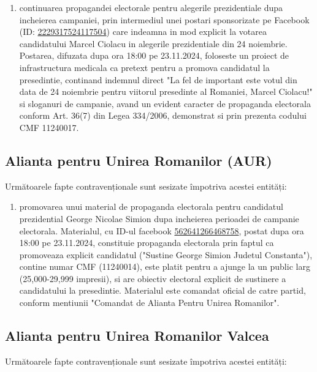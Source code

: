 \documentclass[a4paper,12pt]{article}
\begin{document}
\begin{enumerate}[leftmargin=*, label=\arabic*.)]
    \item continuarea propagandei electorale pentru alegerile prezidentiale dupa incheierea campaniei, prin intermediul unei postari sponsorizate pe Facebook (ID: \href{https://www.facebook.com/ads/library/?id=2229317524117504}{2229317524117504}) care indeamna in mod explicit la votarea candidatului Marcel Ciolacu in alegerile prezidentiale din 24 noiembrie. Postarea, difuzata dupa ora 18:00 pe 23.11.2024, foloseste un proiect de infrastructura medicala ca pretext pentru a promova candidatul la presedintie, continand indemnul direct "La fel de important este votul din data de 24 noiembrie pentru viitorul presedinte al Romaniei, Marcel Ciolacu!" si sloganuri de campanie, avand un evident caracter de propaganda electorala conform Art. 36(7) din Legea 334/2006, demonstrat si prin prezenta codului CMF 11240017.
\end{enumerate}

\vspace{0.5cm}

\subsection{Alianta pentru Unirea Romanilor (AUR)}
Următoarele fapte contravenționale sunt sesizate împotriva acestei entități:

\begin{enumerate}[leftmargin=*, label=\arabic*.)]
    \item promovarea unui material de propaganda electorala pentru candidatul prezidential George Nicolae Simion dupa incheierea perioadei de campanie electorala. Materialul, cu ID-ul facebook \href{https://www.facebook.com/ads/library/?id=562641266468758}{562641266468758}, postat dupa ora 18:00 pe 23.11.2024, constituie propaganda electorala prin faptul ca promoveaza explicit candidatul ("Sustine George Simion Judetul Constanta"), contine numar CMF (11240014), este platit pentru a ajunge la un public larg (25,000-29,999 impresii), si are obiectiv electoral explicit de sustinere a candidatului la presedintie. Materialul este comandat oficial de catre partid, conform mentiunii "Comandat de Alianta Pentru Unirea Romanilor".
\end{enumerate}

\vspace{0.5cm}

\subsection{Alianta pentru Unirea Romanilor Valcea}
Următoarele fapte contravenționale sunt sesizate împotriva acestei entități:
\end{document}
